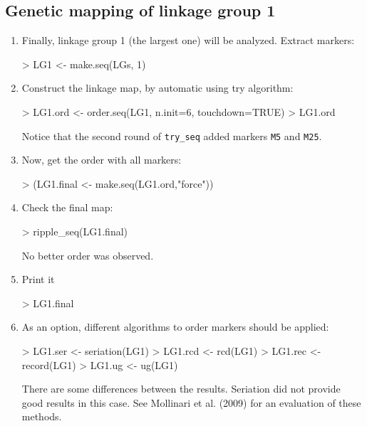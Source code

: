 \documentclass[letterpaper,12pt,oneside]{article}
\begin{document}
\subsection{Genetic mapping of linkage group 1}
\begin{enumerate}
\item Finally, linkage group 1 (the largest one) will be analyzed. Extract markers:
\begin{Schunk}
\begin{Sinput}
> LG1 <- make.seq(LGs, 1)
\end{Sinput}
\end{Schunk}

\item Construct the linkage map, by automatic using try algorithm:
\begin{Schunk}
\begin{Sinput}
> LG1.ord <- order.seq(LG1, n.init=6, touchdown=TRUE)
> LG1.ord
\end{Sinput}
\end{Schunk}
Notice that the second round of {\tt try_seq} added markers {\tt M5} and {\tt M25}.

\item Now, get the order with all markers:
\begin{Schunk}
\begin{Sinput}
> (LG1.final <- make.seq(LG1.ord,"force"))
\end{Sinput}
\end{Schunk}

\item Check the final map:
\begin{Schunk}
\begin{Sinput}
> ripple_seq(LG1.final)
\end{Sinput}
\end{Schunk}

No better order was observed.

\item Print it
\begin{Schunk}
\begin{Sinput}
> LG1.final
\end{Sinput}
\end{Schunk}

\item As an option, different algorithms to order markers should be applied: 

\begin{Schunk}
\begin{Sinput}
> LG1.ser <- seriation(LG1)
> LG1.rcd <- rcd(LG1)
> LG1.rec <- record(LG1)
> LG1.ug  <- ug(LG1)
\end{Sinput}
\end{Schunk}

There are some differences between the results. Seriation did not provide good results in this case. See Mollinari et al. (2009) for an evaluation of these methods.
  
\end{enumerate}
\end{document}
